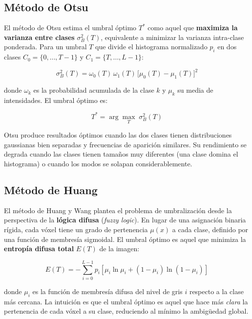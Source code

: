 \documentclass[12pt, a4paper]{article}
\begin{document}
\subsection{Método de Otsu}

El método de Otsu \cite{otsu1979} estima el umbral óptimo $T^*$ como aquel que
\textbf{maximiza la varianza entre clases} $\sigma_B^2(T)$, equivalente a minimizar la
varianza intra-clase ponderada. Para un umbral $T$ que divide el histograma normalizado
$p_i$ en dos clases $C_0 = \{0, \ldots, T-1\}$ y $C_1 = \{T, \ldots, L-1\}$:

\begin{equation}
  \sigma_B^2(T) = \omega_0(T)\,\omega_1(T)\,\bigl[\mu_0(T) - \mu_1(T)\bigr]^2
  \label{eq:otsu}
\end{equation}

donde $\omega_k$ es la probabilidad acumulada de la clase $k$ y $\mu_k$ su media de
intensidades. El umbral óptimo es:

\begin{equation}
  T^* = \arg\max_{T}\; \sigma_B^2(T)
\end{equation}

Otsu produce resultados óptimos cuando las dos clases tienen distribuciones gaussianas
bien separadas y frecuencias de aparición similares. Su rendimiento se degrada cuando las
clases tienen tamaños muy diferentes (una clase domina el histograma) o cuando los modos
se solapan considerablemente.

\subsection{Método de Huang}

El método de Huang y Wang \cite{huang1995} plantea el problema de umbralización desde
la perspectiva de la \textbf{lógica difusa} (\textit{fuzzy logic}). En lugar de una
asignación binaria rígida, cada vóxel tiene un grado de pertenencia $\mu(x)$ a cada clase,
definido por una función de membresía sigmoidal. El umbral óptimo es aquel que minimiza
la \textbf{entropía difusa total} $E(T)$ de la imagen:

\begin{equation}
  E(T) = -\sum_{i=0}^{L-1} p_i \left[ \mu_i \ln \mu_i + (1 - \mu_i) \ln(1 - \mu_i) \right]
  \label{eq:huang}
\end{equation}

donde $\mu_i$ es la función de membresía difusa del nivel de gris $i$ respecto a la
clase más cercana. La intuición es que el umbral óptimo es aquel que hace más \emph{clara}
la pertenencia de cada vóxel a su clase, reduciendo al mínimo la ambigüedad global.
\end{document}
